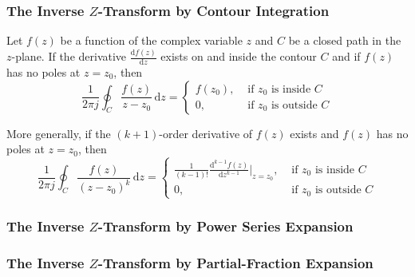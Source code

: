 \subsubsection{The Inverse \texorpdfstring{$Z$-Transform}{Z-Transform} by Contour Integration}\label{subsubsec:Inverse Z-Transform by Contour Integration}
\begin{definition}\label{def:Cauchy Integral Theorem}
  Let $f(z)$ be a function of the complex variable $z$ and $C$ be a closed path in the $z$-plane.
  If the derivative $\frac{\mathrm{d}f(z)}{\mathrm{d}z}$ exists on and inside the contour $C$ and if $f(z)$ has no poles at $z = z_{0}$, then
  \begin{equation}\label{eq:Cauchy Integral Theorem Specfic}
    \frac{1}{2 \pi j} \oint_{C} \frac{f(z)}{z-z_{0}} \, \mathrm{d}z = \begin{cases}
      f(z_{0}), & \text{ if $z_{0}$ is inside $C$} \\
      0, & \text{ if $z_{0}$ is outside $C$}
    \end{cases}
  \end{equation}

  More generally, if the $(k+1)$-order derivative of $f(z)$ exists and $f(z)$ has no poles at $z = z_{0}$, then
  \begin{equation}\label{eq:Cauchy Integral THeorem General}
    \frac{1}{2 \pi j} \oint_{C} \frac{f(z)}{\left( z-z_{0} \right)^{k}} \, \mathrm{d}z = \begin{cases}
      \frac{1}{\left( k-1 \right)!} \frac{\mathrm{d}^{k-1}f(z)}{\mathrm{d}z^{k-1}} \bigg \vert_{z=z_{0}}, & \text{ if $z_{0}$ is inside $C$} \\
      0, & \text{ if $z_{0}$ is outside $C$}
    \end{cases}
  \end{equation}
\end{definition}


\subsubsection{The Inverse \texorpdfstring{$Z$-Transform}{Z-Transform} by Power Series Expansion}\label{subsubsec:Inverse Z-Transform by Power Series Expansion}
\subsubsection{The Inverse \texorpdfstring{$Z$-Transform}{Z-Transform} by Partial-Fraction Expansion}\label{subsubsec:Inverse Z-Transform by Partial-Fraction Expansion}
